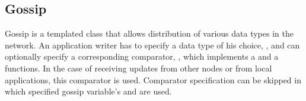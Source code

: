 

\subsection{Gossip}

Gossip is a templated class that allows distribution of various data types in the network. An application writer has to specify a data type of his choice, , and can optionally specify a corresponding comparator, , which implements a  and a  functions. 
In the case of receiving updates from other nodes or from local applications, this comparator is used. Comparator specification can be skipped in which specified gossip variable's  and  are used. 

